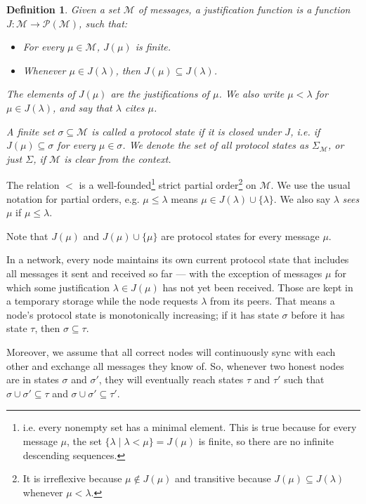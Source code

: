\documentclass[12pt]{article}
\newtheorem{definition}{Definition}
\begin{document}
\begin{definition}
  Given a set $\mathcal{M}$ of \emph{messages}, a \emph{justification function} is a function $J: \mathcal{M} \rightarrow \mathcal{P}(\mathcal{M})$, such that:
  \begin{itemize}
    \item For every $\mu \in \mathcal{M}$, $J(\mu)$ is finite.
    \item Whenever $\mu \in J(\lambda)$, then $J(\mu) \subseteq J(\lambda)$.
  \end{itemize}
  The elements of $J(\mu)$ are the \emph{justifications} of $\mu$. We also write $\mu < \lambda$ for $\mu \in J(\lambda)$, and say that $\lambda$ \emph{cites} $\mu$.

  A finite set $\sigma \subseteq \mathcal{M}$ is called a \emph{protocol state} if it is closed under $J$, i.e. if $J(\mu) \subseteq \sigma$ for every $\mu \in \sigma$. We denote the set of all protocol states as $\Sigma_{\mathcal{M}}$, or just $\Sigma$, if $\mathcal{M}$ is clear from the context.
\end{definition}

The relation $<$ is a well-founded\footnote{i.e. every nonempty set has a minimal element. This is true because for every message $\mu$, the set $\{ \lambda \mid \lambda < \mu \} = J(\mu)$ is finite, so there are no infinite descending sequences.} strict partial order\footnote{It is irreflexive because $\mu \notin J(\mu)$ and transitive because $J(\mu) \subseteq J(\lambda)$ whenever $\mu < \lambda$.} on $\mathcal{M}$. We use the usual notation for partial orders, e.g. $\mu \leq \lambda$ means $\mu \in J(\lambda) \cup \{\lambda\}$. We also say $\lambda$ \emph{sees} $\mu$ if $\mu \leq \lambda$.

Note that $J(\mu)$ and $J(\mu) \cup \{\mu\}$ are protocol states for every message $\mu$.

In a network, every node maintains its own current protocol state that includes all messages it sent and received so far — with the exception of messages $\mu$ for which some justification $\lambda \in J(\mu)$ has not yet been received. Those are kept in a temporary storage while the node requests $\lambda$ from its peers. That means a node's protocol state is monotonically increasing; if it has state $\sigma$ before it has state $\tau$, then $\sigma \subseteq \tau$.

Moreover, we assume that all correct nodes will continuously sync with each other and exchange all messages they know of. So, whenever two honest nodes are in states $\sigma$ and $\sigma'$, they will eventually reach states $\tau$ and $\tau'$ such that $\sigma \cup \sigma' \subseteq \tau$ and $\sigma \cup \sigma' \subseteq \tau'$.
\end{document}
